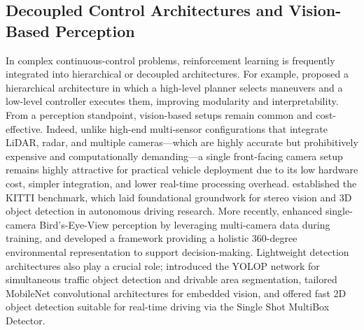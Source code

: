 \documentclass[sn-mathphys,Numbered]{sn-jnl}
\begin{document}
\subsection{Decoupled Control Architectures and Vision-Based Perception}
In complex continuous-control problems, reinforcement learning is frequently integrated into hierarchical or decoupled architectures. For example, \citet{qiao2020hierarchical} proposed a hierarchical architecture in which a high-level planner selects maneuvers and a low-level controller executes them, improving modularity and interpretability. From a perception standpoint, vision-based setups remain common and cost-effective. Indeed, unlike high-end multi-sensor configurations that integrate LiDAR, radar, and multiple cameras—which are highly accurate but prohibitively expensive and computationally demanding—a single front-facing camera setup remains highly attractive for practical vehicle deployment due to its low hardware cost, simpler integration, and lower real-time processing overhead. \citet{geiger2012kitti} established the KITTI benchmark, which laid foundational groundwork for stereo vision and 3D object detection in autonomous driving research. More recently, \citet{busch2023improved} enhanced single-camera Bird's-Eye-View perception by leveraging multi-camera data during training, and \citet{unger2023multicamera} developed a framework providing a holistic 360-degree environmental representation to support decision-making. Lightweight detection architectures also play a crucial role; \citet{wu2022yolop} introduced the YOLOP network for simultaneous traffic object detection and drivable area segmentation, \citet{howard2017mobilenets} tailored MobileNet convolutional architectures for embedded vision, and \citet{liu2016ssd} offered fast 2D object detection suitable for real-time driving via the Single Shot MultiBox Detector.
\end{document}
